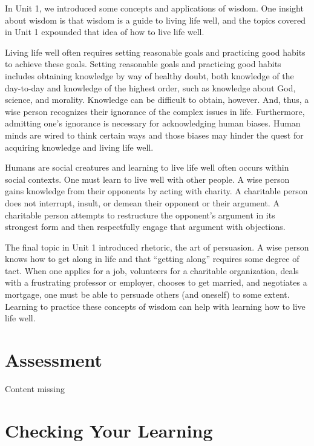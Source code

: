 \documentclass[
]{book}
\begin{document}
In Unit 1, we introduced some concepts and applications of wisdom. One insight about wisdom is that wisdom is a guide to living life well, and the topics covered in Unit 1 expounded that idea of how to live life well.

Living life well often requires setting reasonable goals and practicing good habits to achieve these goals. Setting reasonable goals and practicing good habits includes obtaining knowledge by way of healthy doubt, both knowledge of the day-to-day and knowledge of the highest order, such as knowledge about God, science, and morality. Knowledge can be difficult to obtain, however. And, thus, a wise person recognizes their ignorance of the complex issues in life. Furthermore, admitting one's ignorance is necessary for acknowledging human biases. Human minds are wired to think certain ways and those biases may hinder the quest for acquiring knowledge and living life well.

Humans are social creatures and learning to live life well often occurs within social contexts. One must learn to live well with other people. A wise person gains knowledge from their opponents by acting with charity. A charitable person does not interrupt, insult, or demean their opponent or their argument. A charitable person attempts to restructure the opponent's argument in its strongest form and then respectfully engage that argument with objections.

The final topic in Unit 1 introduced rhetoric, the art of persuasion. A wise person knows how to get along in life and that ``getting along'' requires some degree of tact. When one applies for a job, volunteers for a charitable organization, deals with a frustrating professor or employer, chooses to get married, and negotiates a mortgage, one must be able to persuade others (and oneself) to some extent. Learning to practice these concepts of wisdom can help with learning how to live life well.

\hypertarget{assessment}{%
\section*{Assessment}\label{assessment}}

{Content missing}

\hypertarget{checking-your-learning}{%
\section*{Checking Your Learning}\label{checking-your-learning}}
\end{document}
